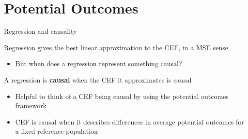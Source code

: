 \documentclass[compress, 8pt]{beamer}
\begin{document}
\section{Potential Outcomes}
\miniframesoff
\begin{frame}
    \tableofcontents[currentsection]
\end{frame}
\miniframeson


\begin{frame}{Regression and causality}

Regression gives the best linear approximation to the CEF, in a MSE sense
\begin{itemize}
    \item But when does a regression represent something causal?
\end{itemize}

\vspace{2ex}
A regression is \textbf{causal} when the CEF it approximates is causal
\begin{itemize}
    \item Helpful to think of a CEF being causal by using the potential outcomes framework
    \item CEF is causal when it describes differences in average potential outcomes for a fixed reference population
\end{itemize}

\end{frame}
\end{document}
